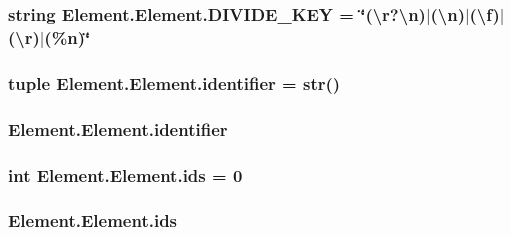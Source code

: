 \subsubsection[{D\+I\+V\+I\+D\+E\+\_\+\+K\+E\+Y}]{\setlength{\rightskip}{0pt plus 5cm}string Element.\+Element.\+D\+I\+V\+I\+D\+E\+\_\+\+K\+E\+Y = \char`\"{}(\textbackslash{}r?\textbackslash{}n)$\vert$(\textbackslash{}n)$\vert$(\textbackslash{}f)$\vert$(\textbackslash{}r)$\vert$(\%n)\char`\"{}\hspace{0.3cm}{\ttfamily [static]}}\label{class_element_1_1_element_ae06a0f0ca0e5499c532f2550cf1ffea6}
\hypertarget{class_element_1_1_element_a86d8c1025236dad25fb5f935a3961482}{}
\subsubsection[{identifier}]{\setlength{\rightskip}{0pt plus 5cm}tuple Element.\+Element.\+identifier = str()\hspace{0.3cm}{\ttfamily [static]}}\label{class_element_1_1_element_a86d8c1025236dad25fb5f935a3961482}
\hypertarget{class_element_1_1_element_a2202a62a079908d52afc0b7796be2981}{}
\subsubsection[{identifier}]{\setlength{\rightskip}{0pt plus 5cm}Element.\+Element.\+identifier}\label{class_element_1_1_element_a2202a62a079908d52afc0b7796be2981}
\hypertarget{class_element_1_1_element_a219a21d962bfef58ad39c9762876588f}{}
\subsubsection[{ids}]{\setlength{\rightskip}{0pt plus 5cm}int Element.\+Element.\+ids = 0\hspace{0.3cm}{\ttfamily [static]}}\label{class_element_1_1_element_a219a21d962bfef58ad39c9762876588f}
\hypertarget{class_element_1_1_element_aaba03a76f52e1bb4ba6ac1b0184be90f}{}
\subsubsection[{ids}]{\setlength{\rightskip}{0pt plus 5cm}Element.\+Element.\+ids}\label{class_element_1_1_element_aaba03a76f52e1bb4ba6ac1b0184be90f}
\hypertarget{class_element_1_1_element_a346648cd57ba439d8b4913a645ab81ba}{}

